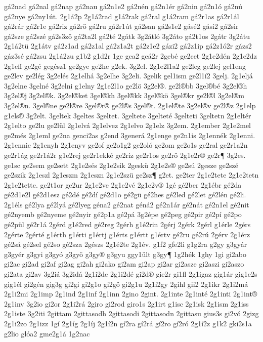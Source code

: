 {gá2nad
gá2nal
gá2nap
gá2nau
gá2n1e2
gá2nén
gá2n1ér
gá2nin
gá2n1ó
gá2nú
gá2nye
gá2ny1út.
2g1á2p
2g1á2rad
g1á2rak
gá2ral
g1á2ram
gá2r1as
gá2r1ál
gá2rár
gá2r1e
gá2riz
gá2rö
gá2ru
gá2r1út
gá2san
gá2s1e2
gásé2
gási2
gá2sir
gá2sze
gá2szé
gá2s3zö
gá2ta2l
gá2té
2gátk
3g2átló
3g2áto
gá2t1os
2gátr
3g2átu
2g1á2tü
2g1átv
gá2z1ad
gá2z1al
gá2z1a2t
gá2z1e2
gázi2
gá2z1ip
gá2z1ó2r
gázs2
gáz3sé
gá2zsu
2g1á2zu
g1b2
g1d2r
1ge
gea2
geá2r
2gebé
ge2cet
2g1e2dén
2g1e2dz
2g1eff
ge2gé
gegész1
ge2gye
ge2he
g2ek.
3g2el.
2g1e2l1a2
ge2leg
ge2lej
gel1eng
ge2lev
ge2lég
3g2elés
2g1elhá
3g2elhe
3g2eli.
3gelik
gel1ism
ge2l1í2
3gelj.
2g1eljá
3g2elne
3gelné
3g2elni
g1elny
2g1e2l1o
ge2lö
3g2el®.
ge2l®bb
3gel®bé
3g2el®h
3g2el®j
3g2el®k.
3g2el®ket
3gel®kh
3gel®kk
3gel®kö
3gel®kr
ge2l®l
3g2el®m
3g2el®n.
3gel®ne
ge2l®re
3gel®r®
ge2l®s
3gel®t.
2g1el®te
3g2el®v
ge2l®z
2g1elp
g1els®
3g2elt.
3geltek
3geltes
3geltet.
3geltete
3gelteté
3gelteti
3geltetn
2g1eltér
2g1elto
ge2lu
ge2lül
2g1elvá
2g1elvez
2g1elvo
2g1elz
3g2em.
2g1ember
2g1e2mel
ge2més
2g1eml
ge2na
genci2as
g2end
3generá
2g1enge
ge2n1is
2g1ennék
2g1enni.
2g1ennie
2g1enyh
2g1enyv
ge2of
ge2o1g2
ge2oló
ge2om
ge2o1s
ge2ral
ge2r1a2n
ge2r1ág
ge2r1á2r
g1e2rej
ge2r1ekké
ge2riz
ge2r1os
ge2rö
2g1e2r®
ge2r¶
3g2es.
ge1sc
ge2sem
ge2sett
2g1e2sés
2g1e2sik
2geskü
2g1e2s®
ge2sú
2gesze
ge2szé
ge2szik
2g1eszl
2g1eszm
2g1eszn
2g1e2szü
ge2sz¶
g2et.
ge2ter
2g1e2tete
2g1e2tetn
2g1e2tette.
ge2t1or
ge2ur
2g1e2ve
2g1e2vé
2g1e2v®
1gé
gé2ber
2g1ébr
gé2da
gé2d1e2l
gé2d1esz
gé2dé
gé2dí
gé2d1o
gé2gü
gé2hes
gé2led
gé2let
gé2lén
gé2li.
2g1éls
gé2lya
gé2lyá
gé2lyeg
géna2
gé2nat
géná2
gé2n1ár
gé2nát
gé2n1el
gé2nit
gé2nyemb
gé2nyeme
gé2nyir
gé2p1a
gé2pá
3g2épe
gé2peg
gé2pir
gé2pí
gé2po
gé2pül
gé2r1á
2gérd
g1é2red
gé2reg
2gérh
g1é2rin
2gérj
2gérk
2gérl
g1érle
2gérs
2gérte
2gérté
g1érth
g1érti
g1értj
g1érts
g1értt
g1értv
gé2ru
gé2rú
2gérv
2g1érz
gé2sá
gé2sel
gé2so
gé2sza
2gészs
2g1é2te
2g1év.
g1f2
gfe2li
g1g2ra
g2gy
g3gyár
g3gyér
g3gyi
g3gyó
g3gyö
g3gy®
g3gyu
ggy1ült
g3gy¶
1g2hék
1ghy
1gi
gi2abo
gi2ac
gi2ad
gi2af
gi2ag
gi2ah
gi2ako
gi2am
gi2ap
gi2ar
gi2asze
gi2aszi
gi2aszo
gi2ata
gi2av
3g2iá
3g2idá
2g1i2de
2g1i2dé
gi2d®
gie2r
gi1fl
2g1igaz
gig1ár
gig1e2s
gig1él
gi2gén
gig3g
gi2gi
gi2g1o
gi2gö
gi2g1u
2g1i2gy
2gihl
gii2
2g1ikr
2g1i2má
2g1i2mi
2g1imp
2g1ind
2g1inf
2g1inn
2gino
2gint.
2g1inte
2g1inté
2g1inti
2g1int®
2g1inv
3g2io
gi2or
2g1i2rá
2giro
gi2rod
giro1s
2g1irt
g1isc
2g1isk
2g1ism
2g1iss
2g1iste
3g2iti
2gittam
2gittasodh
2gittasodi
2gittasodn
2gittasu
gius3s
gi2vó
2gizg
2g1i2zo
2g1izz
1gí
2g1íg
2g1íj
2g1í2n
gí2ra
gí2rá
gí2ro
gí2ró
2g1í2z
g1k2
gki2s1a
g2lio
glóa2
gme2g1á
1g2nac
}
